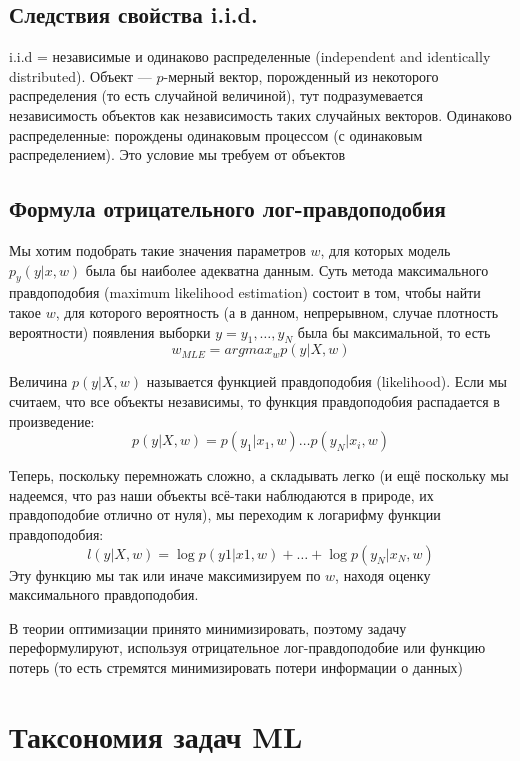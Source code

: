 \documentclass[a4paper, 14pt]{article}
\begin{document}
    \subsection{Следствия свойства i.i.d.}
    
    i.i.d = независимые и одинаково распределенные (independent and identically distributed).
    Объект — $p$-мерный вектор, порожденный из некоторого распределения (то есть случайной величиной), тут
    подразумевается независимость объектов как независимость таких случайных векторов.
    Одинаково распределенные: порождены одинаковым процессом (с одинаковым распределением).
    Это условие мы требуем от объектов
    
    \subsection{Формула отрицательного лог-правдоподобия}
    
    Мы хотим подобрать такие значения параметров $w$, для которых модель $p_y(y|x,w)$ была бы наиболее адекватна данным.
    Суть метода максимального правдоподобия (maximum likelihood estimation) состоит в том, чтобы найти такое $w$, для
    которого вероятность (а в данном, непрерывном, случае плотность вероятности) появления выборки $y={y_1,\dots,y_N}$
    была бы максимальной, то есть \[ w_{MLE}=argmax_w p(y|X,w)\]
    
    Величина $p(y|X,w)$ называется функцией правдоподобия (likelihood).
    Если мы считаем, что все объекты независимы, то функция правдоподобия распадается в произведение:
    \[ p(y|X,w) = p(y_1|x_1,w) \dots p(y_N|x_i,w) \]
    
    Теперь, поскольку перемножать сложно, а складывать легко (и ещё поскольку мы надеемся, что раз наши объекты всё-таки
    наблюдаются в природе, их правдоподобие отлично от нуля), мы переходим к логарифму функции правдоподобия:
    \[ l(y|X,w)= \log p(y1|x1,w) + \dots + \log p(y_N|x_N,w) \]
    Эту функцию мы так или иначе максимизируем по $w$, находя оценку максимального правдоподобия.
    
    В теории оптимизации принято минимизировать, поэтому задачу переформулируют, используя отрицательное
    лог-правдоподобие или функцию потерь (то есть стремятся минимизировать потери информации о данных)
    
    \section{Таксономия задач ML}
    
\end{document}
